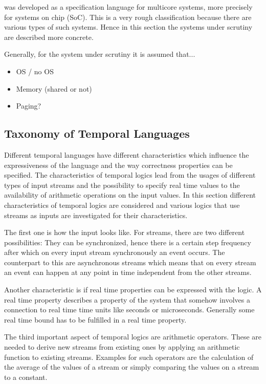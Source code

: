\tessla was developed as a specification language for multicore systems, more precisely for systems on chip (SoC). This is a very rough classification because there are various types of such systems. Hence in this section the systems under scrutiny are described more concrete.

Generally, for the system under scrutiny it is assumed that...

\begin{itemize}
	\item OS / no OS
	\item Memory (shared or not)
	\item Paging? 
\end{itemize}

\subsection{Taxonomy of Temporal Languages}

Different temporal languages have different characteristics which influence the expressiveness of the language and the way correctness properties can be specified. The characteristics of temporal logics lead from the usages of different types of input streams and the possibility to specify real time values to the availability of arithmetic operations on the input values. In this section different characteristics of temporal logics are considered and various logics that use streams as inputs are investigated for their characteristics.

The first one is how the input looks like. For streams, there are two different possibilities: They can be synchronized, hence there is a certain step frequency after which on every input stream synchronously an event occurs. The counterpart to this are asynchronous streams which means that on every stream an event can happen at any point in time independent from the other streams.

Another characteristic is if real time properties can be expressed with the logic. A real time property describes a property of the system that somehow involves a connection to real time time units like seconds or microseconds. Generally some real time bound has to be fulfilled in a real time property.

The third important aspect of temporal logics are arithmetic operators. These are needed to derive new streams from existing ones by applying an arithmetic function to existing streams. Examples for such operators are the calculation of the average of the values of a stream or simply comparing the values on a stream to a constant.

